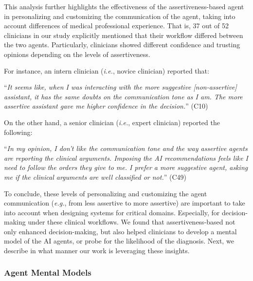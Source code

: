 \vspace{2.5mm}

This analysis further highlights the effectiveness of the assertiveness-based agent in personalizing and customizing the communication of the agent, taking into account differences of medical professional experience.
That is, 37 out of 52 clinicians in our study explicitly mentioned that their workflow differed between the two agents.
Particularly, clinicians showed different confidence and trusting opinions depending on the levels of assertiveness.

\vspace{2.5mm}

\noindent
For instance, an intern clinician ({\it i.e.}, novice clinician) reported that:

\vspace{2.5mm}

\noindent
``{\it It seems like, when I was interacting with the more suggestive [non-assertive] assistant, it has the same doubts on the communication tone as I am. The more assertive assistant gave me higher confidence in the decision.}'' (C10)

\vspace{2.5mm}

\noindent
On the other hand, a senior clinician ({\it i.e.}, expert clinician) reported the following:

\vspace{2.5mm}

\noindent
``{\it In my opinion, I don't like the communication tone and the way assertive agents are reporting the clinical arguments. Imposing the AI recommendations feels like I need to follow the orders they give to me. I prefer a more suggestive agent, asking me if the clinical arguments are well classified or not.}'' (C49)

\vspace{2.5mm}

To conclude, these levels of personalizing and customizing the agent communication ({\it e.g.}, from less assertive to more assertive) are important to take into account when designing systems for critical domains.
Especially, for decision-making under these clinical workflows.
We found that assertiveness-based not only enhanced decision-making, but also helped clinicians to develop a mental model of the AI agents, or probe for the likelihood of the diagnosis.
Next, we describe in what manner our work is leveraging these insights.

\subsubsection{Agent Mental Models}
\label{sec:app005007003002}

